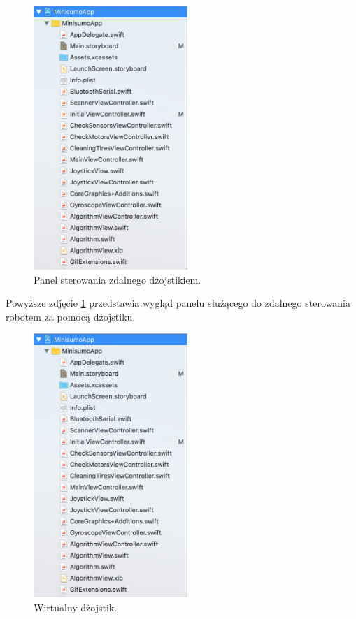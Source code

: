 \begin{figure}[H]
	\centering
		\includegraphics[width=0.75\linewidth, height=10cm, keepaspectratio]{pic05/structure.png}
	\caption{Panel sterowania zdalnego dżojstikiem.}
	\label{fig:joystickview}	
\end{figure}

Powyższe zdjęcie \ref{fig:joystickview} przedstawia wygląd panelu służącego do zdalnego sterowania robotem za pomocą dżojstiku.

\begin{figure}[H]
	\centering
		\includegraphics[width=0.75\linewidth, height=10cm, keepaspectratio]{pic05/structure.png}
	\caption{Wirtualny dżojstik.}
	\label{fig:joystickdirections}	
\end{figure}

